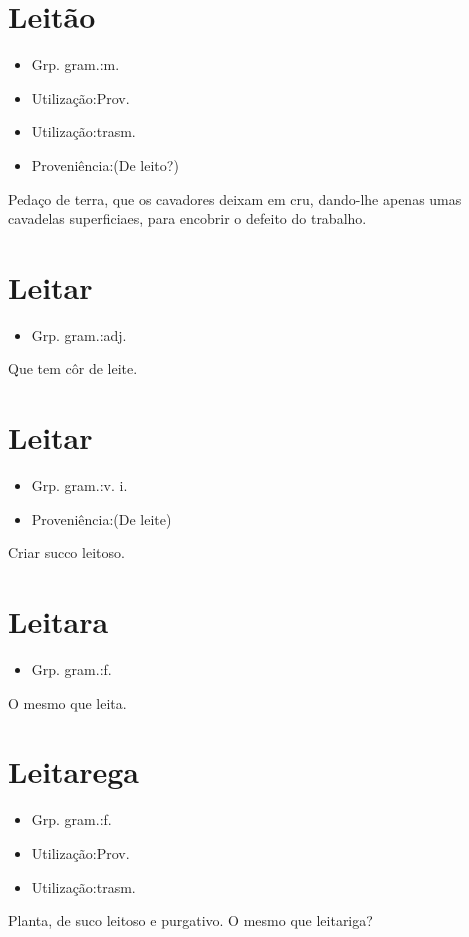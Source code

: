 \section{Leitão}
\begin{itemize}
\item {Grp. gram.:m.}
\end{itemize}
\begin{itemize}
\item {Utilização:Prov.}
\end{itemize}
\begin{itemize}
\item {Utilização:trasm.}
\end{itemize}
\begin{itemize}
\item {Proveniência:(De \textunderscore leito\textunderscore ?)}
\end{itemize}
Pedaço de terra, que os cavadores deixam em cru, dando-lhe apenas umas cavadelas superficiaes, para encobrir o defeito do trabalho.
\section{Leitar}
\begin{itemize}
\item {Grp. gram.:adj.}
\end{itemize}
Que tem côr de leite.
\section{Leitar}
\begin{itemize}
\item {Grp. gram.:v. i.}
\end{itemize}
\begin{itemize}
\item {Proveniência:(De \textunderscore leite\textunderscore )}
\end{itemize}
Criar succo leitoso.
\section{Leitara}
\begin{itemize}
\item {Grp. gram.:f.}
\end{itemize}
O mesmo que \textunderscore leita\textunderscore .
\section{Leitarega}
\begin{itemize}
\item {Grp. gram.:f.}
\end{itemize}
\begin{itemize}
\item {Utilização:Prov.}
\end{itemize}
\begin{itemize}
\item {Utilização:trasm.}
\end{itemize}
Planta, de suco leitoso e purgativo.
O mesmo que \textunderscore leitariga\textunderscore ?
